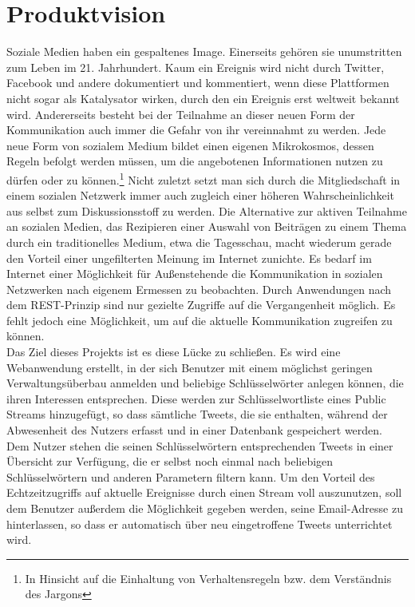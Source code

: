 \section{Produktvision}
%
Soziale Medien haben ein gespaltenes Image. Einerseits gehören sie unumstritten zum Leben im 21. Jahrhundert. Kaum ein Ereignis wird nicht durch Twitter, Facebook und andere dokumentiert und kommentiert, wenn diese Plattformen nicht sogar als Katalysator wirken, durch den ein Ereignis erst weltweit bekannt wird. Andererseits besteht bei der Teilnahme an dieser neuen Form der Kommunikation auch immer die Gefahr von ihr vereinnahmt zu werden. Jede neue Form von sozialem Medium bildet einen eigenen Mikrokosmos, dessen Regeln befolgt werden müssen, um die angebotenen Informationen nutzen zu dürfen oder zu können.\footnote{In Hinsicht auf die Einhaltung von Verhaltensregeln bzw. dem Verständnis des Jargons} Nicht zuletzt setzt man sich durch die Mitgliedschaft in einem sozialen Netzwerk immer auch zugleich einer höheren Wahrscheinlichkeit aus selbst zum Diskussionsstoff zu werden. Die Alternative zur aktiven Teilnahme an sozialen Medien, das Rezipieren einer Auswahl von Beiträgen zu einem Thema durch ein traditionelles Medium, etwa die Tagesschau, macht wiederum gerade den Vorteil einer ungefilterten Meinung im Internet zunichte. Es bedarf im Internet einer Möglichkeit für Außenstehende die Kommunikation in sozialen Netzwerken nach eigenem Ermessen zu beobachten. Durch Anwendungen nach dem REST-Prinzip sind nur gezielte Zugriffe auf die Vergangenheit möglich. Es fehlt jedoch eine Möglichkeit, um auf die aktuelle Kommunikation zugreifen zu können. \\
Das Ziel dieses Projekts ist es diese Lücke zu schließen. Es wird eine Webanwendung erstellt, in der sich Benutzer mit einem möglichst geringen Verwaltungsüberbau anmelden und beliebige Schlüsselwörter anlegen können, die ihren Interessen entsprechen. Diese werden zur Schlüsselwortliste eines Public Streams hinzugefügt, so dass sämtliche Tweets, die sie enthalten, während der Abwesenheit des Nutzers erfasst und in einer Datenbank gespeichert werden. Dem Nutzer stehen die seinen Schlüsselwörtern entsprechenden Tweets in einer Übersicht zur Verfügung, die er selbst noch einmal nach beliebigen Schlüsselwörtern und anderen Parametern filtern kann. Um den Vorteil des Echtzeitzugriffs auf aktuelle Ereignisse durch einen Stream voll auszunutzen, soll dem Benutzer außerdem die Möglichkeit gegeben werden, seine Email-Adresse zu hinterlassen, so dass er automatisch über neu eingetroffene Tweets unterrichtet wird.

